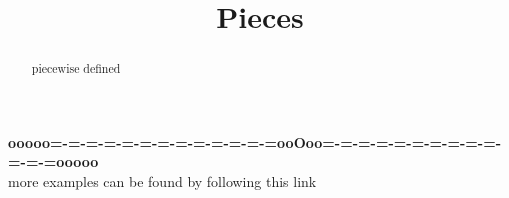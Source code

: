 \documentclass{ximera}
\title{Pieces}
\begin{document}
\begin{abstract}
piecewise defined
\end{abstract}
\maketitle













\begin{center}
\textbf{\textcolor{green!50!black}{ooooo=-=-=-=-=-=-=-=-=-=-=-=-=ooOoo=-=-=-=-=-=-=-=-=-=-=-=-=ooooo}} \\

more examples can be found by following this link\\ 

\end{center}
\end{document}
